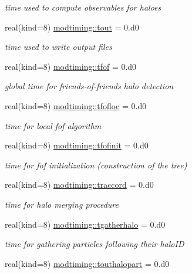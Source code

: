 \begin{DoxyCompactItemize}
\begin{DoxyCompactList}\small\item\em time used to compute observables for haloes \end{DoxyCompactList}\item 
real(kind=8) \hyperlink{namespacemodtiming_aad2ce715be55a32442a507f77e24f096}{modtiming\+::tout} = 0.d0
\begin{DoxyCompactList}\small\item\em time used to write output files \end{DoxyCompactList}\item 
real(kind=8) \hyperlink{namespacemodtiming_ac6dbf200ea4d6d6248bb9df21ed8d2a7}{modtiming\+::tfof} = 0.d0
\begin{DoxyCompactList}\small\item\em global time for friends-\/of-\/friends halo detection \end{DoxyCompactList}\item 
real(kind=8) \hyperlink{namespacemodtiming_a2574a405aaa97058f43e1e6b0b1d96e1}{modtiming\+::tfofloc} = 0.d0
\begin{DoxyCompactList}\small\item\em time for local fof algorithm \end{DoxyCompactList}\item 
real(kind=8) \hyperlink{namespacemodtiming_a2c5b98c383953b670ee94c1022c2d822}{modtiming\+::tfofinit} = 0.d0
\begin{DoxyCompactList}\small\item\em time for fof initialization (construction of the tree) \end{DoxyCompactList}\item 
real(kind=8) \hyperlink{namespacemodtiming_a9b8eac461e18e3b6c057420bae5b004e}{modtiming\+::traccord} = 0.d0
\begin{DoxyCompactList}\small\item\em time for halo merging procedure \end{DoxyCompactList}\item 
real(kind=8) \hyperlink{namespacemodtiming_a6a20740b33d07d1c6b9ed51953b48b0d}{modtiming\+::tgatherhalo} = 0.d0
\begin{DoxyCompactList}\small\item\em time for gathering particles following their halo\+ID \end{DoxyCompactList}\item 
real(kind=8) \hyperlink{namespacemodtiming_ac41b305f5582ff3ca37058380003cfc7}{modtiming\+::touthalopart} = 0.d0

\end{DoxyCompactItemize}

